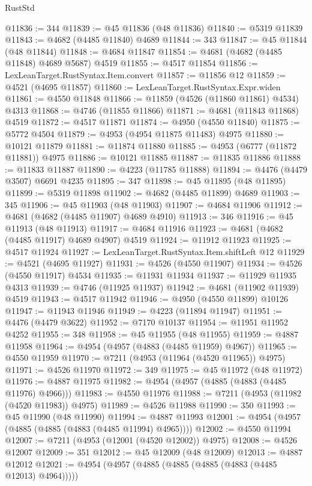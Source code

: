 \begin{lexlean}{RustStd}
\begin{coremodule}
@11836 := 344
@11839 := @45 @11836 (@48 @11836)
@11840 := @5319 @11839
@11843 := @4682 (@4485 @11840) @4689
@11844 := 343
@11847 := @45 @11844 (@48 @11844)
@11848 := @4684 @11847
@11854 := @4681 (@4682 (@4485 @11848) @4689 @5687) @4519
@11855 := @4517 @11854
@11856 := LexLeanTarget.RustSyntax.Item.convert
@11857 := @11856 @12
@11859 := @4521 (@4695 @11857)
@11860 := LexLeanTarget.RustSyntax.Expr.widen
@11861 := @4550 @11848
@11866 := @11859 (@4526 (@11860 @11861) @4534) @4313
@11868 := @4746 (@11855 @11866)
@11871 := @4681 (@11843 @11868) @4519
@11872 := @4517 @11871
@11874 := @4950 (@4550 @11840)
@11875 := @5772 @4504
@11879 := @4953 (@4954 @11875 @11483) @4975
@11880 := @10121 @11879
@11881 := @11874 @11880
@11885 := @4953 (@6777 (@11872 @11881)) @4975
@11886 := @10121 @11885
@11887 := @11835 @11886
@11888 := @11833 @11887
@11890 := @4223 (@11785 @11888)
@11894 := @4476 (@4479 @3507) @6691 @4235
@11895 := 347
@11898 := @45 @11895 (@48 @11895)
@11899 := @5319 @11898
@11902 := @4682 (@4485 @11899) @4689
@11903 := 345
@11906 := @45 @11903 (@48 @11903)
@11907 := @4684 @11906
@11912 := @4681 (@4682 (@4485 @11907) @4689 @4910)
@11913 := 346
@11916 := @45 @11913 (@48 @11913)
@11917 := @4684 @11916
@11923 := @4681 (@4682 (@4485 @11917) @4689 @4907) @4519
@11924 := @11912 @11923
@11925 := @4517 @11924
@11927 := LexLeanTarget.RustSyntax.Item.shiftLeft @12
@11929 := @4521 (@4695 @11927)
@11931 := @4526 (@4550 @11907)
@11934 := @4526 (@4550 @11917) @4534
@11935 := @11931 @11934
@11937 := @11929 @11935 @4313
@11939 := @4746 (@11925 @11937)
@11942 := @4681 (@11902 @11939) @4519
@11943 := @4517 @11942
@11946 := @4950 (@4550 @11899) @10126
@11947 := @11943 @11946
@11949 := @4223 (@11894 @11947)
@11951 := @4476 (@4479 @3622)
@11952 := @7170 @10137
@11954 := @11951 @11952 @4252
@11955 := 348
@11958 := @45 @11955 (@48 @11955)
@11959 := @4887 @11958
@11964 := @4954 (@4957 (@4883 (@4485 @11959) @4967))
@11965 := @4550 @11959
@11970 := @7211 (@4953 (@11964 (@4520 @11965)) @4975)
@11971 := @4526 @11970
@11972 := 349
@11975 := @45 @11972 (@48 @11972)
@11976 := @4887 @11975
@11982 := @4954 (@4957 (@4885 (@4883 (@4485 @11976) @4966)))
@11983 := @4550 @11976
@11988 := @7211 (@4953 (@11982 (@4520 @11983)) @4975)
@11989 := @4526 @11988
@11990 := 350
@11993 := @45 @11990 (@48 @11990)
@11994 := @4887 @11993
@12001 := @4954 (@4957 (@4885 (@4885 (@4883 (@4485 @11994) @4965))))
@12002 := @4550 @11994
@12007 := @7211 (@4953 (@12001 (@4520 @12002)) @4975)
@12008 := @4526 @12007
@12009 := 351
@12012 := @45 @12009 (@48 @12009)
@12013 := @4887 @12012
@12021 := @4954 (@4957 (@4885 (@4885 (@4885 (@4883 (@4485 @12013) @4964)))))

\end{coremodule}
\end{lexlean}
